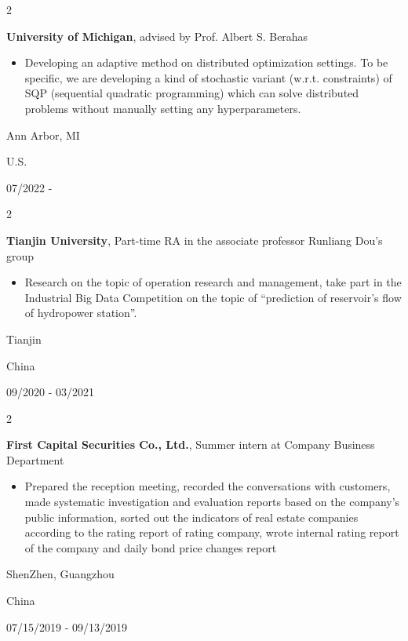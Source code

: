 \documentclass[10pt, letterpaper]{article}
\newenvironment{highlights}{
    \begin{itemize}[
        topsep=0.10 cm,
        parsep=0.10 cm,
        partopsep=0pt,
        itemsep=0pt,
        leftmargin=0.4 cm + 10pt
    ]
}{
    \end{itemize}
} %
\newenvironment{twocolentry}[2][]{
    \onecolentry
    \def\secondColumn{#2}
    \setcolumnwidth{\fill, 4.5 cm}
    \begin{paracol}{2}
}{
    \switchcolumn \raggedleft \secondColumn
    \end{paracol}
    \endonecolentry
} %
\begin{document}
        \begin{twocolentry}{
            Ann Arbor, MI

            U.S.

            07/2022 -
        }
            \textbf{University of Michigan}, advised by Prof. Albert S. Berahas
            \begin{highlights}
                \item Developing an adaptive method on distributed optimization settings. To be specific, we are
                developing a kind of stochastic variant (w.r.t. constraints) of SQP (sequential quadratic programming)
                which can solve distributed problems without manually setting any hyperparameters.
            \end{highlights}
        \end{twocolentry}

        \begin{twocolentry}{
            Tianjin

            China

            09/2020 - 03/2021
        }
            \textbf{Tianjin University}, Part-time RA in the associate professor Runliang Dou's group
            \begin{highlights}
                \item Research on the topic of operation research and management, take part in the Industrial Big
                Data Competition on the topic of “prediction of reservoir’s flow of hydropower station”.
            \end{highlights}
        \end{twocolentry}

        \begin{twocolentry}{
            ShenZhen, Guangzhou

            China

            07/15/2019 - 09/13/2019
        }
            \textbf{First Capital Securities Co., Ltd.}, Summer intern at Company Business Department
            \begin{highlights}
                \item Prepared the reception meeting, recorded the conversations with customers, made systematic
                investigation and evaluation reports based on the company's public information, sorted out the
                indicators of real estate companies according to the rating report of rating company, wrote internal
                rating report of the company and daily bond price changes report
            \end{highlights}
        \end{twocolentry}
\end{document}
